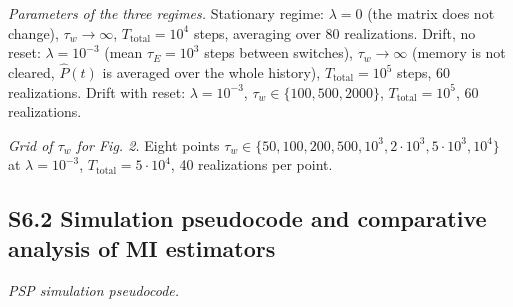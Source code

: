 \documentclass[pdflatex,sn-mathphys-ay]{sn-jnl}
\begin{document}
\emph{Parameters of the three regimes.} Stationary regime: \(\lambda = 0\) (the matrix does not change), \(\tau_w \to \infty\), \(T_{\text{total}} = 10^4\) steps, averaging over 80 realizations. Drift, no reset: \(\lambda = 10^{-3}\) (mean \(\tau_E = 10^3\) steps between switches), \(\tau_w \to \infty\) (memory is not cleared, \(\hat{P}(t)\) is averaged over the whole history), \(T_{\text{total}} = 10^5\) steps, 60 realizations. Drift with reset: \(\lambda = 10^{-3}\), \(\tau_w \in \{100, 500, 2000\}\), \(T_{\text{total}} = 10^5\), 60 realizations.



\emph{Grid of \(\tau_w\) for Fig. 2.} Eight points \(\tau_w \in \{50, 100, 200, 500, 10^3, 2\cdot 10^3, 5\cdot 10^3, 10^4\}\) at \(\lambda = 10^{-3}\), \(T_{\text{total}} = 5 \cdot 10^4\), 40 realizations per point.



\subsection*{S6.2 Simulation pseudocode and comparative analysis of MI estimators}\label{s6.2-simulation-pseudocode-and-comparative-analysis-of-mi-estimators}



\emph{PSP simulation pseudocode.}
\end{document}
